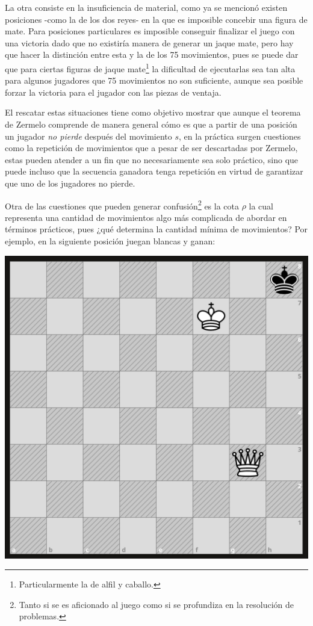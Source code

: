 \documentclass[twoside,openright,12pt,a4paper,spanish]{book}
\begin{document}
La otra consiste en la insuficiencia de material, como ya se mencionó existen posiciones -como la de los dos reyes- en la que es imposible concebir una figura de mate. Para posiciones particulares es imposible conseguir finalizar el juego con una victoria dado que no existiría manera de generar un jaque mate, pero hay que hacer la distinción entre esta y la de los 75 movimientos, pues se puede dar que para ciertas figuras de jaque mate\footnote{Particularmente la de alfil y caballo.} la dificultad de ejecutarlas sea tan alta para algunos jugadores que 75 movimientos no son suficiente, aunque sea posible forzar la victoria para el jugador con las piezas de ventaja. 

El rescatar estas situaciones tiene como objetivo mostrar que aunque el teorema de Zermelo comprende de manera general cómo es que a partir de una posición un jugador \emph{no pierde} después del movimiento $s$, en la práctica surgen cuestiones como la repetición de movimientos que a pesar de ser descartadas por Zermelo, estas pueden atender a un fin que no necesariamente sea solo práctico, sino que puede incluso que la secuencia ganadora tenga repetición en virtud de garantizar que uno de los jugadores no pierde.

Otra de las cuestiones que pueden generar confusión\footnote{Tanto si se es aficionado al juego como si se profundiza en la resolución de problemas.} es la cota $\rho$ la cual representa una cantidad de movimientos algo más complicada de abordar en términos prácticos, pues ¿qué determina la cantidad mínima de movimientos? Por ejemplo, en la siguiente posición juegan blancas y ganan:
\medskip
\begin{center}
    \includegraphics[width=8.0 cm,height=8.0 cm]{mate_en_1.png}
\end{center}
\end{document}
